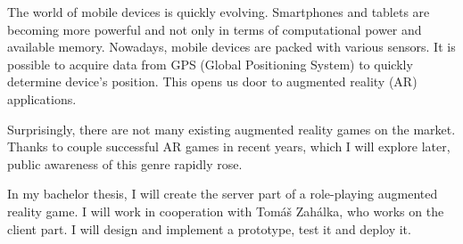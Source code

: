 The world of mobile devices is quickly evolving. Smartphones and tablets are becoming more powerful and not only in terms of computational power and available memory. Nowadays, mobile devices are packed with various sensors. It is possible to acquire data from GPS (Global Positioning System) to quickly determine device’s position. This opens us door to augmented
reality (AR) applications. 

Surprisingly, there are not many existing augmented reality games on the market. Thanks to couple successful AR games in recent years, which I will explore later,  public awareness of this genre rapidly rose.

In my bachelor thesis, I will create the server part of a role-playing augmented reality game. I will work in cooperation with Tomáš Zahálka, who works on the client part. I will design and implement a prototype, test it and deploy it.
